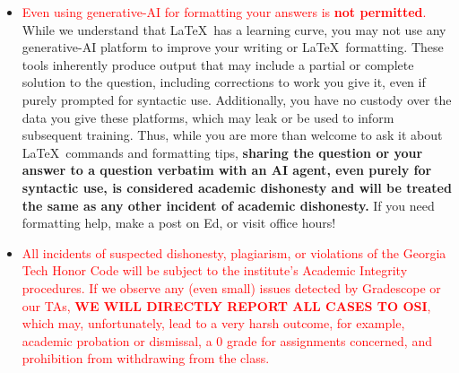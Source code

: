 \begin{itemize}
    \item \textcolor{red}{Even using generative-AI for formatting your answers is \textbf{not permitted}.} While we understand that \LaTeX~has a learning curve, you may not use any generative-AI platform to improve your writing or \LaTeX~formatting. These tools inherently produce output that may include a partial or complete solution to the question, including corrections to work you give it, even if purely prompted for syntactic use. Additionally, you have no custody over the data you give these platforms, which may leak or be used to inform subsequent training. Thus, while you are more than welcome to ask it about \LaTeX~commands and formatting tips, \textbf{sharing the question or your answer to a question verbatim with an AI agent, even purely for syntactic use, is considered academic dishonesty and will be treated the same as any other incident of academic dishonesty.} If you need formatting help, make a post on Ed, or visit office hours!
    \item \textcolor{red}{All incidents of suspected dishonesty, plagiarism, or violations of the Georgia Tech Honor Code will be subject to the institute's Academic Integrity procedures. If we observe any (even small) issues detected by Gradescope or our TAs, \textbf{WE WILL DIRECTLY REPORT ALL CASES TO OSI}, which may, unfortunately, lead to a very harsh outcome, for example, academic probation or dismissal, a 0 grade for assignments concerned, and prohibition from withdrawing from the class.}
\end{itemize}
